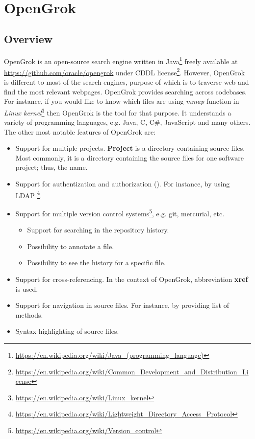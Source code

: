 \chapter{OpenGrok}
\label{chap:opengrok}

\section{Overview}
\label{opengrok_overview}
OpenGrok is an open-source search engine written in
Java\footnote{\url{https://en.wikipedia.org/wiki/Java\_(programming\_language)}}
freely available at \url{https://github.com/oracle/opengrok} under CDDL
license\footnote{\url{https://en.wikipedia.org/wiki/Common\_Development\_and\_Distribution\_License}}.
However, OpenGrok is different to most of the search engines, purpose of which is to traverse web and find the most relevant
webpages. OpenGrok provides searching across codebases. For instance, if you would like to know which files are using
\textit{mmap} function in \textit{Linux kernel}\footnote{\url{https://en.wikipedia.org/wiki/Linux\_kernel}} then
OpenGrok is the tool for that purpose. It understands a variety of
programming languages, e.g. Java, C, C\#, JavaScript and many others.
The other most notable features of OpenGrok are:
\begin{itemize}
    \item Support for multiple projects. \textbf{Project} is a directory containing source files. Most commonly, it is a directory
    containing the source files for one software project; thus, the name.
    \item Support for authentization and authorization (\cite{OpengrokAuthLayer}). For instance, by using LDAP
        \footnote{\url{https://en.wikipedia.org/wiki/Lightweight_Directory_Access_Protocol}}.
    \item Support for multiple version control systems\footnote{\url{https://en.wikipedia.org/wiki/Version\_control}},
        e.g. git, mercurial, etc.
        \begin{itemize}
            \item Support for searching in the repository history.
            \item Possibility to annotate a file.
            \item Possibility to see the history for a specific file.
        \end{itemize}
    \item Support for cross-referencing. In the context of OpenGrok, abbreviation \textbf{xref} is used.
    \item Support for navigation in source files. For instance, by providing list of methods.
    \item Syntax highlighting of source files.
\end{itemize}

